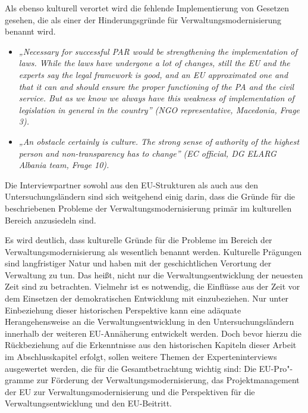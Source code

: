 Als ebenso kulturell verortet wird die fehlende Implementierung von Gesetzen gesehen, die als einer der Hinderungsgründe für Verwaltungsmodernisierung benannt wird.
\begin{itemize}[label={}]
\item \textit{„Necessary for successful PAR would be strengthening the implementation of laws. While the laws have undergone a lot of changes, still the EU and the experts say the legal framework is good, and an EU approximated one and that it can and should ensure the proper functioning of the PA and the civil service. But as we know we always have this weakness of implementation of legislation in general in the country” (NGO representative, Macedonia, Frage 3).}
\item \textit{„An obstacle certainly is culture. The strong sense of authority of the highest person and non-transparency has to change” (EC official, DG ELARG Albania team, Frage 10).}
\end{itemize}
Die Interviewpartner sowohl aus den EU-Strukturen als auch aus den Untersuchungsländern sind sich weitgehend einig darin, dass die Gründe für die beschriebenen Probleme der Verwaltungsmodernisierung primär im kulturellen Bereich anzusiedeln sind.\par
Es wird deutlich, dass kulturelle Gründe für die Probleme im Bereich der Verwaltungsmodernisierung als wesentlich benannt werden. Kulturelle Prägungen sind langfristiger Natur und haben mit der geschichtlichen Verortung der Verwaltung zu tun. Das heißt, nicht nur die Verwaltungsentwicklung der neuesten Zeit sind zu betrachten. Vielmehr ist es notwendig, die Einflüsse aus der Zeit vor dem Einsetzen der demokratischen Entwicklung mit einzubeziehen. Nur unter Einbeziehung dieser historischen Perspektive kann eine adäquate Herangehensweise an die Verwaltungsentwicklung in den Untersuchungsländern innerhalb der weiteren EU-Annäherung entwickelt werden. Doch bevor hierzu die Rückbeziehung auf die Erkenntnisse aus den historischen Kapiteln dieser Arbeit im Abschlusskapitel erfolgt, sollen weitere Themen der Experteninterviews ausgewertet werden, die für die Gesamtbetrachtung wichtig sind: Die EU-Pro"-gramme zur Förderung der Verwaltungsmodernisierung, das Projektmanagement der EU zur Verwaltungsmodernisierung und die Perspektiven für die Verwaltungsentwicklung und den EU-Beitritt.

